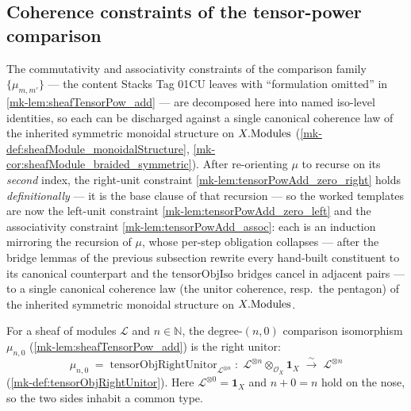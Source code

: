 \subsection{Coherence constraints of the tensor-power comparison}
\label{mk-subsec:sgr_tensorPowAdd_constraints}

The commutativity and associativity constraints of the comparison family
\(\{\mu_{m,m'}\}\) --- the content Stacks Tag 01CU leaves with ``formulation
omitted'' in \ref{mk-lem:sheafTensorPow_add} --- are decomposed here into named
iso-level identities, so each can be discharged against a single canonical
coherence law of the inherited symmetric monoidal structure on \(X.\mathrm{Modules}\)
(\ref{mk-def:sheafModule_monoidalStructure},
\ref{mk-cor:sheafModule_braided_symmetric}). After re-orienting \(\mu\) to recurse on
its \emph{second} index, the right-unit constraint
\ref{mk-lem:tensorPowAdd_zero_right} holds \emph{definitionally} --- it is the base
clause of that recursion --- so the worked templates are now the left-unit
constraint \ref{mk-lem:tensorPowAdd_zero_left} and the associativity constraint
\ref{mk-lem:tensorPowAdd_assoc}: each is an induction mirroring the recursion of
\(\mu\), whose per-step obligation collapses --- after the bridge lemmas of the
previous subsection rewrite every hand-built constituent to its canonical
counterpart and the \(\mathrm{tensorObjIso}\) bridges cancel in adjacent pairs ---
to a single canonical coherence law (the unitor coherence, resp.\ the pentagon) of
the inherited symmetric monoidal structure on \(X.\mathrm{Modules}\).

\begin{lemma}\label{mk-lem:tensorPowAdd_zero_right}
  \leanok

  For a sheaf of modules \(\mathcal{L}\) and \(n \in \mathbb{N}\), the degree-\((n,0)\)
  comparison isomorphism \(\mu_{n,0}\) (\ref{mk-lem:sheafTensorPow_add}) is the right
  unitor:
  \[
    \mu_{n,0} \;=\;
      \mathrm{tensorObjRightUnitor}_{\mathcal{L}^{\otimes n}}
    \;:\; \mathcal{L}^{\otimes n} \otimes_{\mathcal{O}_X} \mathbf{1}_X
    \;\xrightarrow{\ \sim\ }\; \mathcal{L}^{\otimes n}
  \]
  (\ref{mk-def:tensorObjRightUnitor}). Here \(\mathcal{L}^{\otimes 0} = \mathbf{1}_X\)
  and \(n + 0 = n\) hold on the nose, so the two sides inhabit a common type.
\end{lemma}

